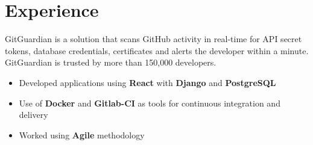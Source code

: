 \documentclass[a4paper]{deedy-resume} %
\begin{document}



\sectionspace
\sectionspace
\sectionspace
{}
\sectionspace
\sectionspace


\section{Experience}


\begin{description}[leftmargin=0pt]
\item GitGuardian is a solution that scans GitHub activity in real-time for API secret tokens, database credentials, certificates and alerts the developer within a minute. GitGuardian is trusted by more than 150,000 developers. 
\begin{itemize}
\item Developed applications using \textbf{React} with \textbf{Django} and \textbf{PostgreSQL}
\item Use of \textbf{Docker} and \textbf{Gitlab-CI} as tools for continuous integration and delivery
\item Worked using \textbf{Agile} methodology
\end{itemize}
\end{description}

\sectionspace %

\end{document}
